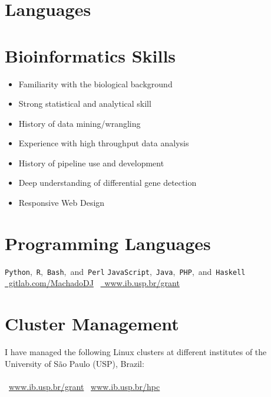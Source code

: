 \begin{minipage}[t]{0.5\textwidth}
    \section{Languages}
    \section{Bioinformatics Skills}
        \begin{itemize}%
            \item Familiarity with the biological background
            \item Strong statistical and analytical skill
            \item History of data mining/wrangling
            \item Experience with high throughput data analysis
            \item History of pipeline use and development
            \item Deep understanding of differential gene detection
            \item Responsive Web Design
        \end{itemize}
\end{minipage}%
\begin{minipage}[t]{0.5\textwidth}
    \section{Programming Languages}
    		{\small \texttt{Python},~\texttt{R},~\texttt{Bash},~and~\texttt{Perl}}
    		{\small \texttt{JavaScript},~\texttt{Java},~\texttt{PHP},~and~\texttt{Haskell}}
    		{\color{MyLightBlue}\href{https://gitlab.com/MachadoDJ}{\faGitlab~gitlab.com/MachadoDJ} ~\href{http://www.ib.usp.br/grant/anfibios/researchSoftware.html}{\faExternalLink~www.ib.usp.br/grant}}
    \section{Cluster Management}
        I have managed the following Linux clusters at different institutes of the University of São Paulo (USP), Brazil:\\~\\
    		{\vspace{-0.5em}\color{MyLightBlue}\faExternalLink~\href{https://www.ib.usp.br/grant/anfibios/researchHPC.html}{www.ib.usp.br/grant}}
    		{\vspace{-0.5em}\color{MyLightBlue}\faExternalLink~\href{https://www.ib.usp.br/hpc/}{www.ib.usp.br/hpc}}
\end{minipage}


